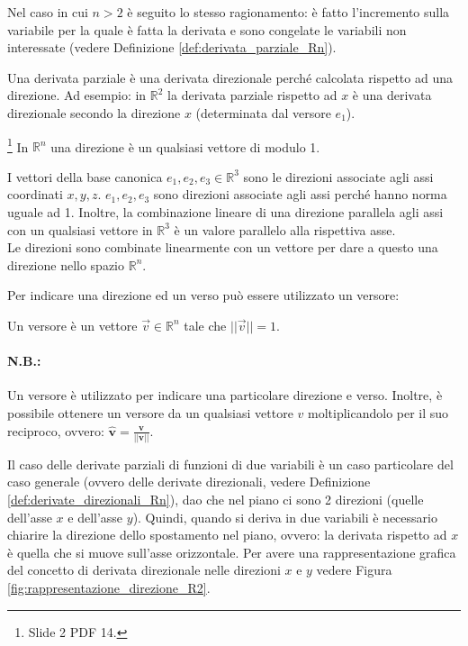 Nel caso in cui $n>2$ è seguito lo stesso ragionamento: è fatto l'incremento sulla variabile per la quale è fatta la derivata e sono congelate le variabili non interessate (vedere Definizione \ref{def:derivata_parziale_Rn}).

Una derivata parziale è una derivata direzionale perché calcolata rispetto ad una direzione. Ad esempio: in $\mathbb R^2$ la derivata parziale rispetto ad $x$ è una derivata direzionale secondo la direzione $x$ (determinata dal versore $e_1$).

\begin{definition}[Direzione]\footnote{Slide 2 PDF 14.}
    In $\mathbb R^n$ una direzione è un qualsiasi vettore di modulo 1.
\end{definition}
I vettori della base canonica $e_1,e_2,e_3\in\mathbb R^3$ sono le direzioni associate agli assi coordinati $x,y,z$. $e_1,e_2,e_3$ sono direzioni associate agli assi perché hanno norma uguale ad 1. Inoltre, la combinazione lineare di una direzione parallela agli assi con un qualsiasi vettore in $\mathbb R^3$ è un valore parallelo alla rispettiva asse.\\
Le direzioni sono combinate linearmente con un vettore per dare a questo una direzione nello spazio $\mathbb R^n$.

Per indicare una direzione ed un verso può essere utilizzato un versore:
\begin{definition}[Versore]
    Un versore è un vettore $\overset{\rightarrow}{v}\in\mathbb R^n$ tale che $||\overset{\rightarrow}{v}||=1$.
\end{definition}

\paragraph{N.B.:} Un versore è utilizzato per indicare una particolare direzione e verso. Inoltre, è possibile ottenere un versore da un qualsiasi vettore $v$ moltiplicandolo per il suo reciproco, ovvero: $\hat {\mathbf{v}}=\frac{\mathbf{v}}{||\mathbf {v}||}.$

Il caso delle derivate parziali di funzioni di due variabili è un caso particolare del caso generale (ovvero delle derivate direzionali, vedere Definizione \ref{def:derivate_direzionali_Rn}), dao che nel piano ci sono 2 direzioni (quelle dell'asse $x$ e dell'asse $y$). Quindi, quando si deriva in due variabili è necessario chiarire la direzione dello spostamento nel piano, ovvero: la derivata rispetto ad $x$ è quella che si muove sull'asse orizzontale. Per avere una rappresentazione grafica del concetto di derivata direzionale nelle direzioni $x$ e $y$ vedere Figura \ref{fig:rappresentazione_direzione_R2}.

